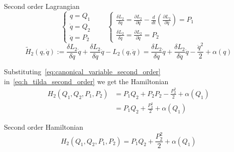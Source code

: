 \begin{frame}{Second order Lagrangian}
  \begin{equation}\label{eq:canonical_variable_second_order}
    \begin{cases}
      q        = Q_1 \\
      \dot{q}  = Q_2 \\
      \ddot{q} = P_2
    \end{cases}
    \qquad
    \begin{cases}
      \frac{\delta L_2}{\delta \dot{q}} =
        \frac{\partial L_2}{\partial \dot{q}} -
        \frac{d}{dt} \left( \frac{\partial L_2}{\partial \ddot{q}} \right) =
        P_1 \\
      \frac{\delta L_2}{\delta \ddot{q}} =
        \frac{\partial L_2}{\partial \ddot{q}} =
        P_2
    \end{cases}
  \end{equation}
  \begin{equation}\label{eq:h_tilda_second_order}
    \tilde{H}_2(q, \dot{q}) :=
      \frac{\delta L_2}{\delta \dot{q}} \dot{q} +
      \frac{\delta L_2}{\delta \ddot{q}} \ddot{q} -
      L_2(q, \ddot{q})
      = \frac{\delta L_2}{\delta \dot{q}} \dot{q} +
      \frac{\delta L_2}{\delta \ddot{q}} \ddot{q} -
      \frac{\ddot{q}^2}{2} + \alpha(q)
  \end{equation}

  Substituting~\eqref{eq:canonical_variable_second_order}
  in~\eqref{eq:h_tilda_second_order} we get the Hamiltonian
  \begin{align*} \label{eq: second-order_motion_eq_ham}
    H_2(Q_1, Q_2, P_1, P_2)
      &= P_1 Q_2 + P_2 P_2 - \frac{P_2^2}{2} + \alpha(Q_1) \\
      &= P_1 Q_2 + \frac{P_2^2}{2} + \alpha(Q_1)
  \end{align*}

  \begin{block}{Second order Hamiltonian}
    \begin{equation*} \label{eq: second-order_motion_eq_ham}
      H_2(Q_1, Q_2, P_1, P_2) = P_1Q_2 + \frac{P_2^2}{2} + \alpha(Q_1)
    \end{equation*}
  \end{block}
\end{frame}

